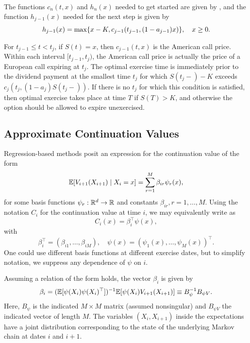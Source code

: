 The functions $c_n(t, x)$ and $h_n(x)$ needed to get started are given by , and the function $h_{j-1}(x)$ needed for the next step is given by
\begin{equation}
	h_{j-1}(x) = \max \{ x - K, c_{j-1}(t_{j-1}, (1 - a_{j-1})x) \}, \quad x \ge 0.
	\label{eq:HJMinusOneDefinition}
\end{equation}

For $t_{j-1} \le t < t_j$, if $S(t) = x$, then $c_{j-1}(t, x)$ is the American call price. Within each interval $[t_{j-1}, t_j)$, the American call price is actually the price of a European call expiring at $t_j$. The optimal exercise time is immediately prior to the dividend payment at the smallest time $t_j$ for which $S(t_j-) - K$ exceeds $c_j(t_j, (1 - a_j)S(t_j-))$. If there is no $t_j$ for which this condition is satisfied, then optimal exercise takes place at time $T$ if $S(T) > K$, and otherwise the option should be allowed to expire unexercised.

\subsection{Approximate Continuation Values}
Regression-based methods posit an expression for the continuation value of the form
\begin{equation} \label{eq:ContinuationValueExpectation}
	\mathbb{E}[V_{i+1}(X_{i+1}) \mid X_i = x] = \sum_{r=1}^M \beta_{ir} \psi_r(x),
\end{equation}
for some basis functions $\psi_r : \mathbb{R}^d \to \mathbb{R}$ and constants $\beta_{ir}, r = 1, \dots, M$. Using the notation $C_i$ for the continuation value at time $i$, we may equivalently write  as
\begin{equation} \label{eq:ContinuationValueVectorForm}
	C_i(x) = \beta_i^\top \psi(x),
\end{equation}
with
\begin{equation*}
	\beta_i^\top = (\beta_{i1}, \dots, \beta_{iM}), \quad \psi(x) = (\psi_1(x), \dots, \psi_M(x))^\top.
\end{equation*}
One could use different basis functions at different exercise dates, but to simplify notation, we suppress any dependence of $\psi$ on $i$.

Assuming a relation of the form  holds, the vector $\beta_i$ is given by
\begin{equation} \label{eq:BetaVectorDefinition}
	\beta_i = (\mathbb{E}[\psi(X_i)\psi(X_i)^\top])^{-1} \mathbb{E}[\psi(X_i)V_{i+1}(X_{i+1})] \equiv B_\psi^{-1} B_{\psi V}.
\end{equation}
Here, $B_\psi$ is the indicated $M \times M$ matrix (assumed nonsingular) and $B_{\psi V}$ the indicated vector of length $M$. The variables $(X_i, X_{i+1})$ inside the expectations have a joint distribution corresponding to the state of the underlying Markov chain at dates $i$ and $i+1$.

